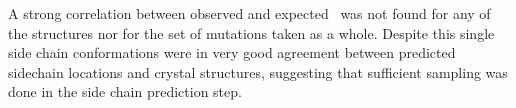 A strong correlation between observed and expected \ddg\ was not found for any of the structures nor for the set of mutations taken as a whole.
Despite this single side chain conformations were in very good agreement between predicted sidechain locations and crystal structures, suggesting that sufficient sampling was done in the side chain prediction step.



